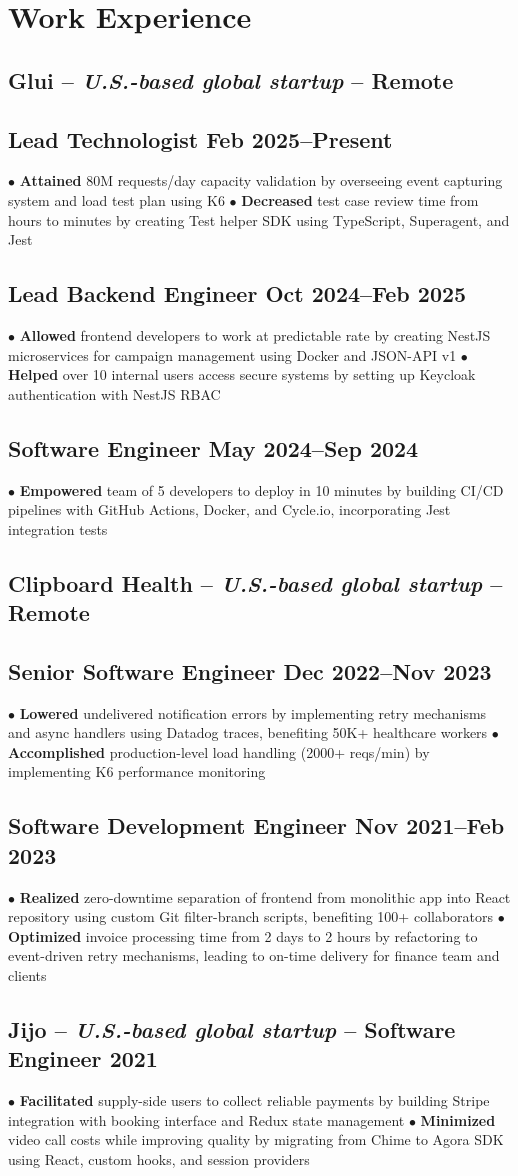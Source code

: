 \documentclass[10pt,a4paper]{article}
\newcommand{\actionverb}[1]{\textcolor{actioncolor}{\textbf{#1}}}
\newcommand{\cvcompany}[3]{
  \subsection{#1 \textcolor{mediumgray}{#2} \textcolor{mediumgray}{\footnotesize -- Remote}}
  #3
}
\newcommand{\cvrole}[3]{
  \subsection{#1 \hfill {\footnotesize\textcolor{mediumgray}{#2}}}
  {\footnotesize #3}
  \vspace{0.2em}
}
\newcommand{\cvsinglecompany}[5]{
  \subsection{#1 \textcolor{mediumgray}{#2} -- \textbf{\small #3} \hfill {\footnotesize\textcolor{mediumgray}{#4}}}
  {\footnotesize #5}
  \vspace{0.2em}
}
\begin{document}
\section{Work Experience}

\cvcompany{Glui}{-- \textit{U.S.-based global startup}}{
  \cvrole{Lead Technologist}{Feb 2025--Present}{
$\bullet$ \actionverb{Attained} 80M requests/day capacity validation by overseeing event capturing system and load test plan using K6 $\bullet$ \actionverb{Decreased} test case review time from hours to minutes by creating Test helper SDK using TypeScript, Superagent, and Jest
  }
  
  \cvrole{Lead Backend Engineer}{Oct 2024--Feb 2025}{
$\bullet$ \actionverb{Allowed} frontend developers to work at predictable rate by creating NestJS microservices for campaign management using Docker and JSON-API v1 $\bullet$ \actionverb{Helped} over 10 internal users access secure systems by setting up Keycloak authentication with NestJS RBAC
  }
  
  \cvrole{Software Engineer}{May 2024--Sep 2024}{
$\bullet$ \actionverb{Empowered} team of 5 developers to deploy in 10 minutes by building CI/CD pipelines with GitHub Actions, Docker, and Cycle.io, incorporating Jest integration tests
  }
}

\cvcompany{Clipboard Health}{-- \textit{U.S.-based global startup}}{
  \cvrole{Senior Software Engineer}{Dec 2022--Nov 2023}{
$\bullet$ \actionverb{Lowered} undelivered notification errors by implementing retry mechanisms and async handlers using Datadog traces, benefiting 50K+ healthcare workers $\bullet$ \actionverb{Accomplished} production-level load handling (2000+ reqs/min) by implementing K6 performance monitoring
  }
  
  \cvrole{Software Development Engineer}{Nov 2021--Feb 2023}{
$\bullet$ \actionverb{Realized} zero-downtime separation of frontend from monolithic app into React repository using custom Git filter-branch scripts, benefiting 100+ collaborators $\bullet$ \actionverb{Optimized} invoice processing time from 2 days to 2 hours by refactoring to event-driven retry mechanisms, leading to on-time delivery for finance team and clients
  }
}

\cvsinglecompany{Jijo}{-- \textit{U.S.-based global startup}}{Software Engineer}{2021}{
$\bullet$ \actionverb{Facilitated} supply-side users to collect reliable payments by building Stripe integration with booking interface and Redux state management $\bullet$ \actionverb{Minimized} video call costs while improving quality by migrating from Chime to Agora SDK using React, custom hooks, and session providers
}
\end{document}

